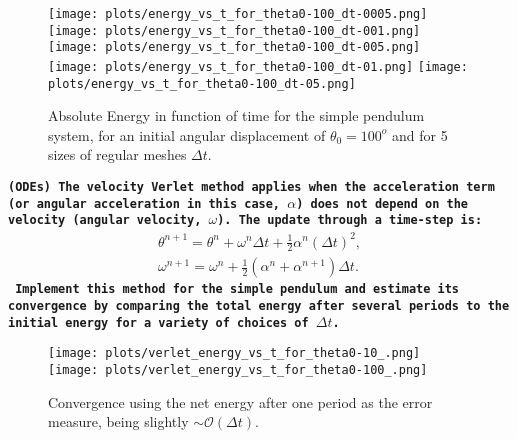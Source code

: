 \documentclass[12pt]{article}
\newcounter{question}[section]
\newcommand{\question}[2] {\vspace{.25in} \fbox{#1} #2 \vspace{.10in}}
\begin{document}
\begin{figure} [ht]
\begin{center}
\texttt{[image: plots/energy\_vs\_t\_for\_theta0-100\_dt-0005.png]} 
\texttt{[image: plots/energy\_vs\_t\_for\_theta0-100\_dt-001.png]} 
\texttt{[image: plots/energy\_vs\_t\_for\_theta0-100\_dt-005.png]} 
\texttt{[image: plots/energy\_vs\_t\_for\_theta0-100\_dt-01.png]} 
\texttt{[image: plots/energy\_vs\_t\_for\_theta0-100\_dt-05.png]} 
\caption{Absolute Energy in function of time for the simple pendulum system, for an initial angular displacement of $\theta_0=100^o$ and for 5 sizes of regular meshes $\Delta t$.}
\label{f4}
\end{center}
\end{figure}

\quad

\newpage



{\color{MidnightBlue}
\question{Q.3}{\texttt{{\bf(ODEs)} {\bf The velocity Verlet method applies when the acceleration term (or angular acceleration in this case, $\alpha$) does not depend on the velocity (angular velocity, $\omega$). The update through a time-step is:
\begin{eqnarray}
 \theta^{n+1} = \theta^n+ \omega^n \Delta t + \frac{1}{2} \alpha^n (\Delta t)^2,\\
\omega^{n+1} = \omega^n + \frac{1}{2} (\alpha^n + \alpha^{n+1})\Delta t.
\end{eqnarray}
Implement this method for the simple pendulum and estimate its convergence by comparing the total energy after several periods to the initial energy for a variety of choices of $\Delta t$.
}}}}

\quad

\begin{figure} [ht!]
\begin{center}
\texttt{[image: plots/verlet\_energy\_vs\_t\_for\_theta0-10\_.png]} 
\texttt{[image: plots/verlet\_energy\_vs\_t\_for\_theta0-100\_.png]} 
\caption{Convergence using the net energy after one period as the error measure, being slightly $\sim \mathcal{O}(\Delta t)$.}
\label{f5}
\end{center}
\end{figure}
\end{document}
